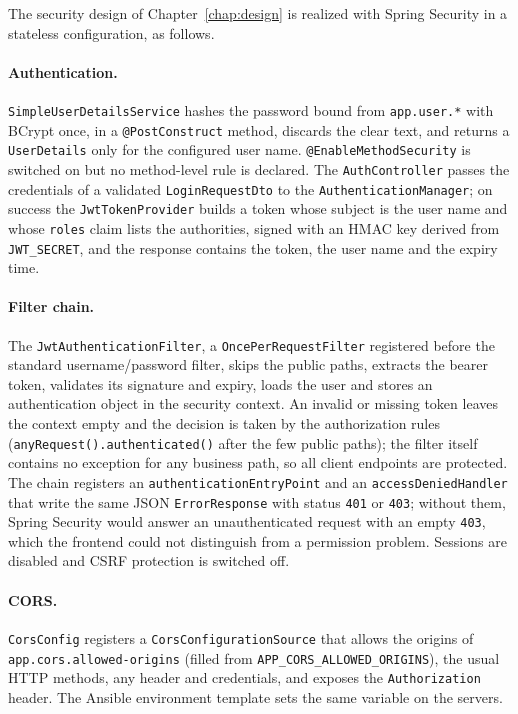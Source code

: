 The security design of Chapter~\ref{chap:design} is realized with Spring Security in a stateless configuration, as follows.

\paragraph{Authentication.} \texttt{SimpleUserDetailsService} hashes the password bound from \texttt{app.user.*} with BCrypt once, in a \texttt{@PostConstruct} method, discards the clear text, and returns a \texttt{UserDetails} only for the configured user name. \texttt{@EnableMethodSecurity} is switched on but no method-level rule is declared. The \texttt{AuthController} passes the credentials of a validated \texttt{LoginRequestDto} to the \texttt{AuthenticationManager}; on success the \texttt{JwtTokenProvider} builds a token whose subject is the user name and whose \texttt{roles} claim lists the authorities, signed with an HMAC key derived from \texttt{JWT\_SECRET}, and the response contains the token, the user name and the expiry time.

\paragraph{Filter chain.} The \texttt{JwtAuthenticationFilter}, a \texttt{OncePerRequestFilter} registered before the standard username/password filter, skips the public paths, extracts the bearer token, validates its signature and expiry, loads the user and stores an authentication object in the security context. An invalid or missing token leaves the context empty and the decision is taken by the authorization rules (\texttt{anyRequest().authenticated()} after the few public paths); the filter itself contains no exception for any business path, so all client endpoints are protected. The chain registers an \texttt{authenticationEntryPoint} and an \texttt{accessDeniedHandler} that write the same JSON \texttt{ErrorResponse} with status \texttt{401} or \texttt{403}; without them, Spring Security would answer an unauthenticated request with an empty \texttt{403}, which the frontend could not distinguish from a permission problem. Sessions are disabled and CSRF protection is switched off.

\paragraph{CORS.} \texttt{CorsConfig} registers a \texttt{CorsConfigurationSource} that allows the origins of \texttt{app.cors.allowed-origins} (filled from \texttt{APP\_CORS\_ALLOWED\_ORIGINS}), the usual HTTP methods, any header and credentials, and exposes the \texttt{Authorization} header. The Ansible environment template sets the same variable on the servers.

